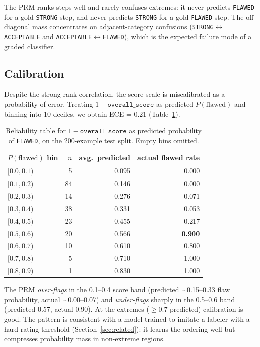 \documentclass[10pt,letterpaper]{article}
\begin{document}
The PRM ranks steps well and rarely confuses extremes: it never predicts \texttt{FLAWED} for a gold-\texttt{STRONG} step, and never predicts \texttt{STRONG} for a gold-\texttt{FLAWED} step. The off-diagonal mass concentrates on adjacent-category confusions (\texttt{STRONG}$\leftrightarrow$\texttt{ACCEPTABLE} and \texttt{ACCEPTABLE}$\leftrightarrow$\texttt{FLAWED}), which is the expected failure mode of a graded classifier.

\subsection{Calibration}
\label{sec:calibration}

Despite the strong rank correlation, the score scale is miscalibrated as a probability of error. Treating $1 - \texttt{overall\_score}$ as predicted $P(\text{flawed})$ and binning into 10 deciles, we obtain ECE = 0.21 (Table~\ref{tab:calib}).

\begin{table}[!ht]
\centering
\small
\caption{Reliability table for $1 - \texttt{overall\_score}$ as predicted probability of \texttt{FLAWED}, on the 200-example test split. Empty bins omitted.}
\label{tab:calib}
\begin{tabular}{lrrr}
\toprule
$P(\text{flawed})$ bin & $n$ & avg.\ predicted & actual flawed rate \\
\midrule
$[0.0, 0.1)$ & 5 & 0.095 & 0.000 \\
$[0.1, 0.2)$ & 84 & 0.146 & 0.000 \\
$[0.2, 0.3)$ & 14 & 0.276 & 0.071 \\
$[0.3, 0.4)$ & 38 & 0.331 & 0.053 \\
$[0.4, 0.5)$ & 23 & 0.455 & 0.217 \\
$[0.5, 0.6)$ & 20 & 0.566 & \textbf{0.900} \\
$[0.6, 0.7)$ & 10 & 0.610 & 0.800 \\
$[0.7, 0.8)$ & 5 & 0.710 & 1.000 \\
$[0.8, 0.9)$ & 1 & 0.830 & 1.000 \\
\bottomrule
\end{tabular}
\end{table}

The PRM \emph{over-flags} in the 0.1--0.4 score band (predicted $\sim$0.15--0.33 flaw probability, actual $\sim$0.00--0.07) and \emph{under-flags} sharply in the 0.5--0.6 band (predicted 0.57, actual 0.90). At the extremes ($\geq 0.7$ predicted) calibration is good. The pattern is consistent with a model trained to imitate a labeler with a hard rating threshold (Section~\ref{sec:related}): it learns the ordering well but compresses probability mass in non-extreme regions.
\end{document}
